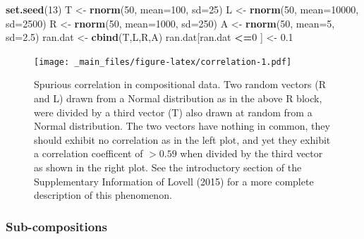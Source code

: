 \documentclass[onecolumn]{article}
\newenvironment{Shaded}{\begin{snugshade}}{\end{snugshade}}
\newcommand{\DataTypeTok}[1]{\textcolor[rgb]{0.13,0.29,0.53}{#1}}
\newcommand{\DecValTok}[1]{\textcolor[rgb]{0.00,0.00,0.81}{#1}}
\newcommand{\FloatTok}[1]{\textcolor[rgb]{0.00,0.00,0.81}{#1}}
\newcommand{\KeywordTok}[1]{\textcolor[rgb]{0.13,0.29,0.53}{\textbf{#1}}}
\newcommand{\NormalTok}[1]{#1}
\newcommand{\OperatorTok}[1]{\textcolor[rgb]{0.81,0.36,0.00}{\textbf{#1}}}
\newcommand{\StringTok}[1]{\textcolor[rgb]{0.31,0.60,0.02}{#1}}
\begin{document}
\begin{Shaded}
\begin{Highlighting}[]
\KeywordTok{set.seed}\NormalTok{(}\DecValTok{13}\NormalTok{)}
\NormalTok{T <-}\StringTok{ }\KeywordTok{rnorm}\NormalTok{(}\DecValTok{50}\NormalTok{, }\DataTypeTok{mean=}\DecValTok{100}\NormalTok{, }\DataTypeTok{sd=}\DecValTok{25}\NormalTok{)}
\NormalTok{L <-}\StringTok{ }\KeywordTok{rnorm}\NormalTok{(}\DecValTok{50}\NormalTok{, }\DataTypeTok{mean=}\DecValTok{10000}\NormalTok{, }\DataTypeTok{sd=}\DecValTok{2500}\NormalTok{)}
\NormalTok{R <-}\StringTok{ }\KeywordTok{rnorm}\NormalTok{(}\DecValTok{50}\NormalTok{, }\DataTypeTok{mean=}\DecValTok{1000}\NormalTok{, }\DataTypeTok{sd=}\DecValTok{250}\NormalTok{)}
\NormalTok{A <-}\StringTok{ }\KeywordTok{rnorm}\NormalTok{(}\DecValTok{50}\NormalTok{, }\DataTypeTok{mean=}\DecValTok{5}\NormalTok{, }\DataTypeTok{sd=}\FloatTok{2.5}\NormalTok{)}
\NormalTok{ran.dat <-}\StringTok{ }\KeywordTok{cbind}\NormalTok{(T,L,R,A)}
\NormalTok{ran.dat[ran.dat }\OperatorTok{<=}\DecValTok{0}\NormalTok{ ] <-}\StringTok{ }\FloatTok{0.1}
\end{Highlighting}
\end{Shaded}

\begin{figure}
\centering
\texttt{[image: \_main\_files/figure-latex/correlation-1.pdf]}
\caption{\label{fig:correlation}Spurious correlation in compositional data. Two random vectors (R and L) drawn from a Normal distribution as in the above R block, were divided by a third vector (T) also drawn at random from a Normal distribution. The two vectors have nothing in common, they should exhibit no correlation as in the left plot, and yet they exhibit a correlation coefficent of \(>0.59\) when divided by the third vector as shown in the right plot. See the introductory section of the Supplementary Information of Lovell (2015) for a more complete description of this phenomenon.}
\end{figure}

\hypertarget{sub-compositions}{%
\subsubsection{Sub-compositions}\label{sub-compositions}}
\end{document}
